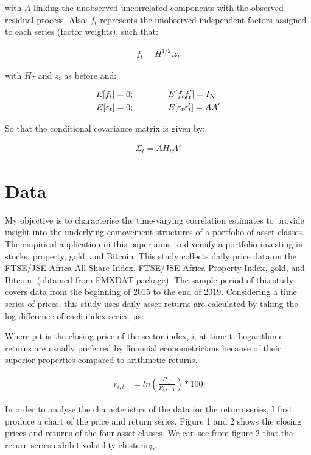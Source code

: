 \documentclass[11pt,preprint, authoryear]{elsarticle}
\numberwithin{equation}{section}
\numberwithin{figure}{section}
\numberwithin{table}{section}
\begin{document}
with \(A\) linking the unobserved uncorrelated components with the
observed residual process. Also: \(f_t\) represents the unobserved
independent factors assigned to each series (factor weights), such that:

\begin{align}
    f_t = H^{1/2}.z_t
\end{align}

with \(H_T\) and \(z_t\) as before and:

\begin{align}
E[f_t] &= 0 ; \qquad \qquad E[f_tf_t'] = I_N \notag \\
E[\varepsilon_t] &= 0 ; \qquad \qquad E[\varepsilon_t\varepsilon_t'] = AA'
\end{align}

So that the conditional covariance matrix is given by:

\begin{align}
    \Sigma_t=AH_tA'
\end{align}

\hypertarget{data}{%
\section{Data}\label{data}}

My objective is to characterise the time-varying correlation estimates
to provide insight into the underlying comovement structures of a
portfolio of asset classes. The empirical application in this paper aims
to diversify a portfolio investing in stocks, property, gold, and
Bitcoin. This study collects daily price data on the FTSE/JSE Africa All
Share Index, FTSE/JSE Africa Property Index, gold, and Bitcoin.
(obtained from FMXDAT package). The sample period of this study covers
data from the beginning of 2015 to the end of 2019. Considering a time
series of prices, this study uses daily asset returns are calculated by
taking the log difference of each index series, as:

Where pit is the closing price of the sector index, i, at time t.
Logarithmic returns are usually preferred by financial econometricians
because of their superior properties compared to arithmetic returns.

\begin{align} 
  r_{i,t} &= ln(\frac{P_{i,t}}{P_{i,t-1}}) * 100
\end{align}

In order to analyse the characteristics of the data for the return
series, I first produce a chart of the price and return series. Figure 1
and 2 shows the closing prices and returns of the four asset classes. We
can see from figure 2 that the return series exhibit volatility
clustering.
\end{document}
